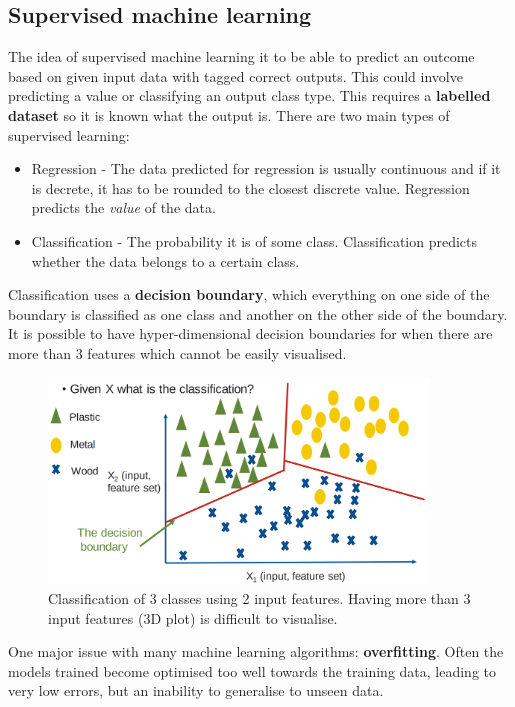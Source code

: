 \documentclass[CS5104-Notes.tex]{subfiles}
\begin{document}
\subsection{Supervised machine learning}
The idea of supervised machine learning it to be able to predict an outcome based on given input data with tagged correct outputs. This could involve predicting a value or classifying an output class type. This requires a \textbf{labelled dataset} so it is known what the output is. There are two main types of supervised learning:
\begin{itemize}
\item Regression - The data predicted for regression is usually continuous and if it is decrete, it has to be rounded to the closest discrete value. Regression predicts the \textit{value} of the data.
\item Classification - The probability it is of some class. Classification predicts whether the data belongs to a certain class. 
\end{itemize}
Classification uses a \textbf{decision boundary}, which everything on one side of the boundary is classified as one class and another on the other side of the boundary. It is possible to have hyper-dimensional decision boundaries for when there are more than 3 features which cannot be easily visualised. 
\begin{figure}[H]
\centering
\includegraphics[width=0.9\textwidth, keepaspectratio]{imgs/classification-example.png}
\caption{Classification of 3 classes using 2 input features. Having more than 3 input features (3D plot) is difficult to visualise.}
\end{figure}
\noindent
One major issue with many machine learning algorithms: \textbf{overfitting}. Often the models trained become optimised too well towards the training data, leading to very low errors, but an inability to generalise to unseen data. 
\end{document}
